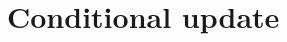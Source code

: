 \documentclass{article}
\newcommand{\vv}[1]{\boldsymbol{#1}}
\newcommand{\mm}[1]{\mathrm{#1}}
\begin{document}

\iffalse
\section{Conditional update}\label{app:conditioning-dag}
\end{document}
